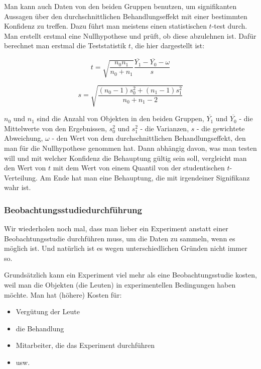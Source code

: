 \documentclass[12pt,a4paper,twoside]{scrartcl}
\numberwithin{equation}{section}
\begin{document}
\noindent
Man kann auch Daten von den beiden Gruppen benutzen, um signifikanten Aussagen über den durchschnittlichen Behandlungseffekt mit einer bestimmten Konfidenz zu treffen. Dazu führt man meistens einen statistischen $t$-test durch. Man erstellt erstmal eine Nullhypothese und prüft, ob diese abzulehnen ist. Dafür berechnet man erstmal die Teststatistik $t$, die hier dargestellt ist:\par

\begin{equation}
  t = \sqrt{\frac{n_0n_1}{n_0+n_1}}\frac{\overline{Y_1}-\overline{Y_0}-\omega}{s}
\end{equation} 

\begin{equation}
  s = \sqrt{\frac{(n_0-1)s_0^2+(n_1-1)s_1^2}{n_0+n_1-2}}
\end{equation} 

\noindent
$n_0$ und $n_1$ sind die Anzahl von Objekten in den beiden Gruppen, $\overline{Y_1}$ und $\overline{Y_0}$ - die Mittelwerte von den Ergebnissen, $s_0^2$ und $s_1^2$ - die Varianzen, $s$ - die gewichtete Abweichung, $\omega$ - den Wert von dem durchschnittlichen Behandlungseffekt, den man für die Nullhypothese genommen hat. Dann abhängig davon, was man testen will und mit welcher Konfidenz die Behauptung gültig sein soll, vergleicht man den Wert von $t$ mit dem Wert von einem Quantil von der studentischen $t$-Verteilung. Am Ende hat man eine Behauptung, die mit irgendeiner Signifikanz wahr ist.\cite{ttest}    
\par    

\subsubsection{Beobachtungsstudiedurchführung}\label{subsubsec:beobachtungsstudietedurchführung}

Wir wiederholen noch mal, dass man lieber ein Experiment anstatt einer Beobachtungsstudie durchführen muss, um die Daten zu sammeln, wenn es möglich ist. Und natürlich ist es wegen unterschiedlichen Gründen nicht immer so.\par 

\noindent
Grundsätzlich kann ein Experiment viel mehr als eine Beobachtungsstudie kosten, weil man die Objekten (die Leuten) in experimentellen Bedingungen haben möchte. Man hat (höhere) Kosten für:\par

\begin{itemize}
  \item Vergütung der Leute
  \item die Behandlung
  \item Mitarbeiter, die das Experiment durchführen
  \item usw.
\end{itemize}
   
\end{document}
